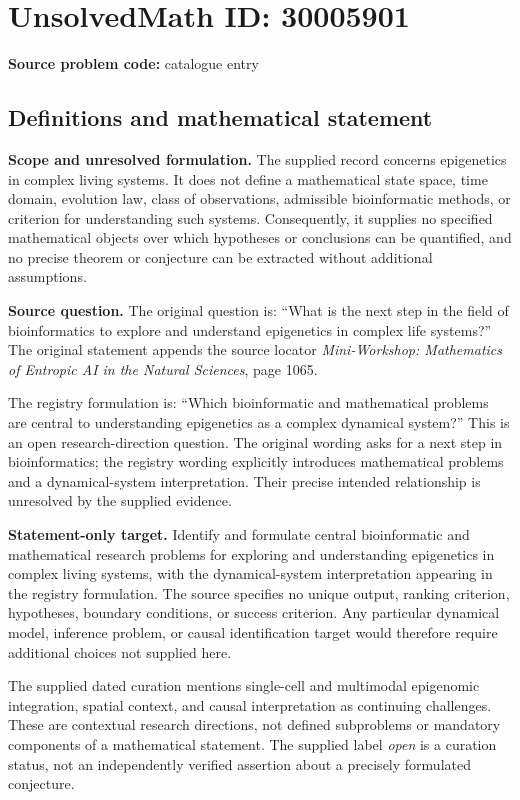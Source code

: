 \documentclass[11pt]{article}
\begin{document}
\section*{UnsolvedMath ID: 30005901}
\textbf{Source problem code:} catalogue entry
\subsection{Definitions and mathematical statement}
\textbf{Scope and unresolved formulation.} The supplied record concerns epigenetics in complex living systems. It does not define a mathematical state space, time domain, evolution law, class of observations, admissible bioinformatic methods, or criterion for understanding such systems. Consequently, it supplies no specified mathematical objects over which hypotheses or conclusions can be quantified, and no precise theorem or conjecture can be extracted without additional assumptions.

\textbf{Source question.} The original question is: ``What is the next step in the field of bioinformatics to explore and understand epigenetics in complex life systems?'' The original statement appends the source locator \emph{Mini-Workshop: Mathematics of Entropic AI in the Natural Sciences}, page 1065.

The registry formulation is: ``Which bioinformatic and mathematical problems are central to understanding epigenetics as a complex dynamical system?'' This is an open research-direction question. The original wording asks for a next step in bioinformatics; the registry wording explicitly introduces mathematical problems and a dynamical-system interpretation. Their precise intended relationship is unresolved by the supplied evidence.

\textbf{Statement-only target.} Identify and formulate central bioinformatic and mathematical research problems for exploring and understanding epigenetics in complex living systems, with the dynamical-system interpretation appearing in the registry formulation. The source specifies no unique output, ranking criterion, hypotheses, boundary conditions, or success criterion. Any particular dynamical model, inference problem, or causal identification target would therefore require additional choices not supplied here.

The supplied dated curation mentions single-cell and multimodal epigenomic integration, spatial context, and causal interpretation as continuing challenges. These are contextual research directions, not defined subproblems or mandatory components of a mathematical statement. The supplied label \emph{open} is a curation status, not an independently verified assertion about a precisely formulated conjecture.
\end{document}
